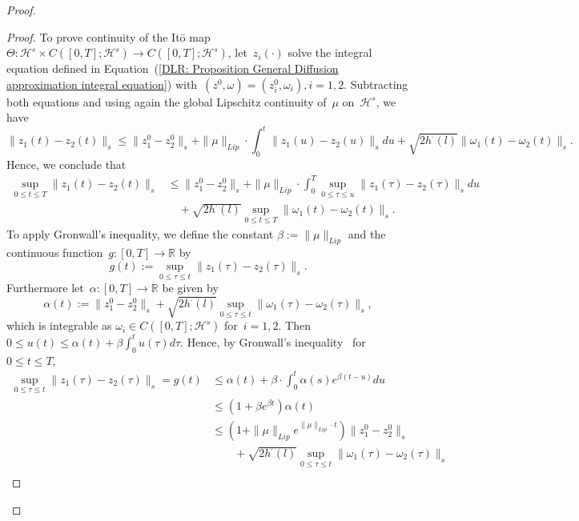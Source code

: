 \begin{proof}
\begin{proof}
    To prove continuity of the It\={o} map~$\Theta : \mathcal{H}^s \times C([0,T]; \mathcal{H}^s) \to  C([0,T]; \mathcal{H}^s)$, let~$z_i (\cdot)$ solve the integral equation defined in Equation~(\ref{DLR: Proposition General Diffusion approximation integral equation}) with~$(z^0, \omega) = (z^0_i, \omega_i), i = 1,2$. Subtracting both equations and using again the global Lipschitz continuity of~$\mu$ on~$\mathcal{H}^s$, we have
    \begin{equation*}
     \| z_1(t) - z_2(t) \|_s  \leq  \| z_1^0 - z_2^0 \|_s + \| \mu \|_{Lip} \cdot \int_0^t  \| z_1(u) - z_2(u) \|_s du + \sqrt{2 h^{\cdot}(l)}  \| \omega_1(t) - \omega_2(t) \|_s.
    \end{equation*}
    Hence, we conclude that
    \begin{align*}
      \sup_{0 \leq t \leq T} \| z_1(t) - z_2(t) \|_s &  \leq  \| z_1^0 - z_2^0 \|_s + \| \mu \|_{Lip} \cdot \int_0^T \sup_{0 \leq \tau \leq u}  \| z_1(\tau) - z_2(\tau) \|_s du \\
      & \quad + \sqrt{2 h^{\cdot}(l)} \sup_{0 \leq t \leq T}  \| \omega_1(t) - \omega_2(t) \|_s.
    \end{align*}
    To apply Gronwall's inequality, we define the constant $\beta := \| \mu \|_{Lip} $ and the continuous function~$g : [0,T] \to \mathbb{R}$ by
    \begin{equation*}
     g (t) := \sup_{0 \leq \tau \leq t} \| z_1(\tau) - z_2(\tau) \|_s.
    \end{equation*}
    Furthermore let~$\alpha: [0,T] \to \mathbb{R}$ be given by
    \begin{equation*}
     \alpha(t) := \| z_1^0 - z_2^0 \|_s + \sqrt{2 h^{\cdot}(l)} \sup_{0 \leq \tau \leq t}  \| \omega_1(\tau) - \omega_2(\tau) \|_s,
    \end{equation*}
    which is integrable as $\omega_i \in  C([0,T]; \mathcal{H}^s)$ for~$i = 1,2$. Then $ 0 \leq u(t) \leq \alpha(t) + \beta  \int_0^t u(\tau)d\tau $. Hence, by Gronwall's inequality~\autocite{Karatzas2000} for $0 \leq t \leq T$,
    \begin{align*}
      \sup_{0 \leq \tau \leq t} \| z_1(\tau) - z_2(\tau) \|_s = g(t) & \leq \alpha(t) + \beta \cdot \int_0^t \alpha(s) e^{\beta (t-u)}du  \\
      & \leq (1+ \beta e^{\beta t}) \alpha(t)\\
      & \leq (1+ \| \mu \|_{Lip} e^{\| \mu \|_{Lip} \cdot t}) \| z_1^0 - z_2^0 \|_s \\
      & \qquad + \sqrt{2 h^{\cdot}(l)} \sup_{0 \leq \tau \leq t}  \| \omega_1(\tau) - \omega_2(\tau) \|_s \\

\end{align*}
\end{proof}
\end{proof}
